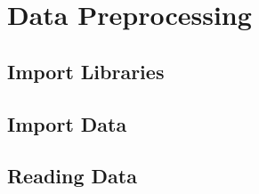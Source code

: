 \section{Data Preprocessing}
  \subsection{Import Libraries}

  \subsection{Import Data}
  \begin{mdframed}[hidealllines=true,backgroundcolor=blue!12]
    
  \end{mdframed}

  \subsection{Reading Data}